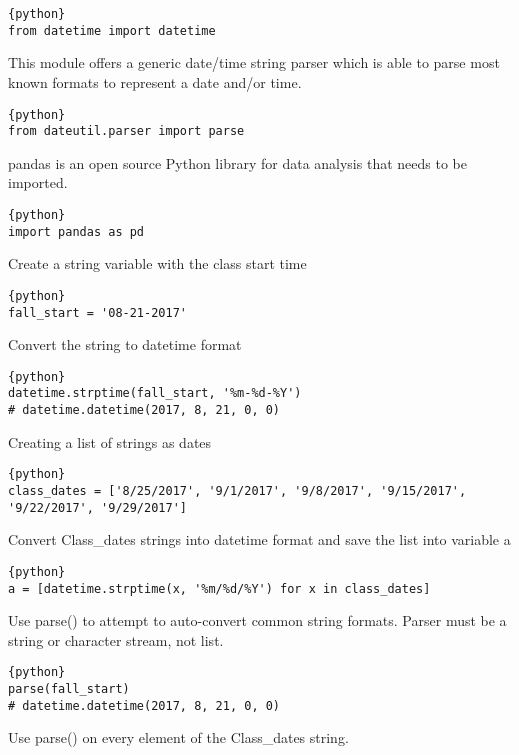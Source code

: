 \begin{lstlisting}{python}
from datetime import datetime
\end{lstlisting}

This module offers a generic date/time string parser which is able to
parse most known formats to represent a date and/or time.

\begin{lstlisting}{python}
from dateutil.parser import parse
\end{lstlisting}

pandas is an open source Python library for data analysis that needs to
be imported.

\begin{lstlisting}{python}
import pandas as pd
\end{lstlisting}

Create a string variable with the class start time

\begin{lstlisting}{python}
fall_start = '08-21-2017'
\end{lstlisting}

Convert the string to datetime format

\begin{lstlisting}{python}
datetime.strptime(fall_start, '%m-%d-%Y')
# datetime.datetime(2017, 8, 21, 0, 0)
\end{lstlisting}

Creating a list of strings as dates

\begin{lstlisting}{python}
class_dates = ['8/25/2017', '9/1/2017', '9/8/2017', '9/15/2017', '9/22/2017', '9/29/2017']
\end{lstlisting}

Convert Class\_dates strings into datetime format and save the list into
variable a

\begin{lstlisting}{python}
a = [datetime.strptime(x, '%m/%d/%Y') for x in class_dates]
\end{lstlisting}

Use parse() to attempt to auto-convert common string formats. Parser
must be a string or character stream, not list.

\begin{lstlisting}{python}
parse(fall_start)
# datetime.datetime(2017, 8, 21, 0, 0)
\end{lstlisting}

Use parse() on every element of the Class\_dates string.


